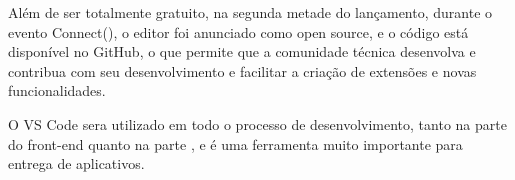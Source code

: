 Além de ser totalmente gratuito, na segunda metade do lançamento, durante o evento Connect(), o editor foi anunciado como open source, e o código está disponível no GitHub, o que permite que a comunidade técnica desenvolva e contribua com seu desenvolvimento e facilitar a criação de extensões e novas funcionalidades.

O VS Code sera utilizado em todo o processo de desenvolvimento, tanto na parte do front-end quanto na parte , e é uma ferramenta muito importante para entrega de aplicativos.